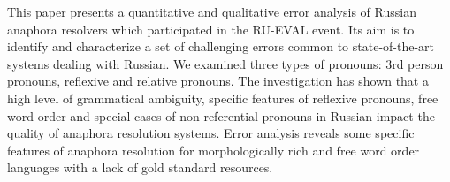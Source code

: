This paper presents a quantitative and qualitative error analysis of Russian anaphora resolvers which participated in the RU-EVAL event. Its aim is to identify and characterize a set of challenging errors common to state-of-the-art systems dealing with Russian. We examined three types of pronouns: 3rd person pronouns, reflexive and relative pronouns. The investigation has shown that a high level of grammatical ambiguity, specific features  of reflexive pronouns, free word order and special cases of non-referential pronouns in Russian impact the quality of anaphora resolution systems. Error analysis reveals some specific features of anaphora resolution for morphologically rich and free word order languages with a lack of gold standard resources.

